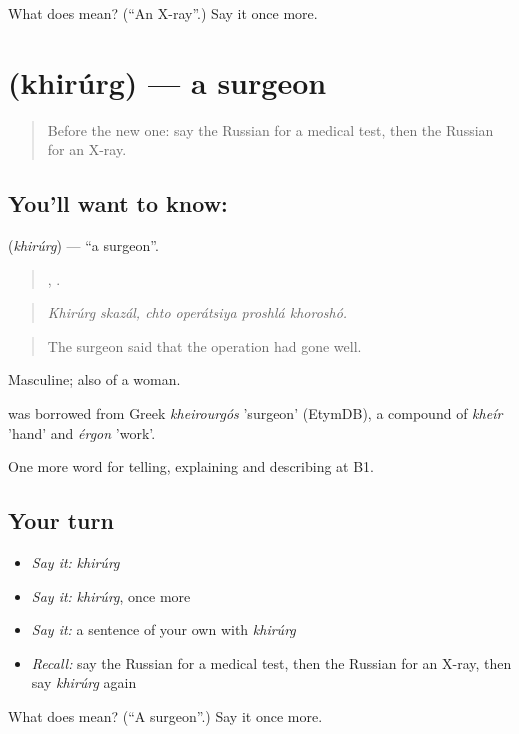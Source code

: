 \begin{tcolorbox}[breakable,colback=teal!4,colframe=teal!35!black,title={Before you move on}]
What does  mean? (\textquotedblleft{}An X-ray\textquotedblright{}.) Say it once more.
\end{tcolorbox}
\section[\texorpdfstring{\ru{хирург} (khirúrg)}{хирург (khirúrg)}]{ (khirúrg) — a surgeon}

\label{lesson:RU-C489-khirurg}



\begin{quote}
Before the new one: say the Russian for a medical test, then the Russian for an X-ray.
\end{quote}

\subsection*{You'll want to know: }
\textbf{} (\emph{khirúrg}) — \textquotedblleft{}a surgeon\textquotedblright{}.

\begin{quote}
 ,    .
\end{quote}

\begin{quote}
\emph{Khirúrg skazál, chto operátsiya proshlá khoroshó.}
\end{quote}

\begin{quote}
The surgeon said that the operation had gone well.
\end{quote}

Masculine; also of a woman.

\begin{cousinweb}
\emph{} was borrowed from Greek \emph{kheirourgós} 'surgeon' (EtymDB), a compound of \emph{kheír} 'hand' and \emph{érgon} 'work'.
\end{cousinweb}

\begin{grammarlens}[title={What you've built}]
One more word for telling, explaining and describing at B1.
\end{grammarlens}

\subsection*{Your turn}
\begin{itemize}
\raggedright
  \item \emph{Say it:} \emph{khirúrg}
  \item \emph{Say it:} \emph{khirúrg}, once more
  \item \emph{Say it:} a sentence of your own with \emph{khirúrg}
  \item \emph{Recall:} say the Russian for a medical test, then the Russian for an X-ray, then say \emph{khirúrg} again
\end{itemize}

\begin{tcolorbox}[breakable,colback=teal!4,colframe=teal!35!black,title={Before you move on}]
What does  mean? (\textquotedblleft{}A surgeon\textquotedblright{}.) Say it once more.
\end{tcolorbox}
